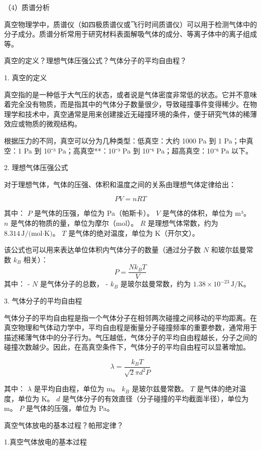 \documentclass[dvipsnames, svgnames,a4paper,11pt]{article}
\begin{document}
（4）质谱分析

真空物理学中，质谱仪（如四极质谱仪或飞行时间质谱仪）可以用于检测气体中的分子成分。质谱分析常用于研究材料表面解吸气体的成分、等离子体中的离子组成等。

\begin{question}
	真空的定义？理想气体压强公式？气体分子的平均自由程？
\end{question}
1. 真空的定义

真空指的是一种低于大气压的状态，或者说是气体密度非常低的状态。它并不意味着完全没有物质，而是指其中的气体分子数量很少，导致碰撞事件变得稀少。在物理学和技术中，真空通常是用来创建接近无碰撞环境的条件，便于研究气体的稀薄效应或物质的微观结构。

根据压力的不同，真空可以分为几种类型：低真空：大约 1000 Pa 到 1 Pa；中真空：1 Pa 到 10⁻³ Pa；高真空**：10⁻³ Pa 到 10⁻⁶ Pa；超高真空：10⁻⁶ Pa 以下。


 2. 理想气体压强公式

对于理想气体，气体的压强、体积和温度之间的关系由理想气体定律给出：

\[
PV = nRT
\]

其中：
 \( P \) 是气体的压强，单位为 Pa（帕斯卡）。
 \( V \) 是气体的体积，单位为 m³。
 \( n \) 是气体的物质的量，单位为摩尔（mol）。
 \( R \) 是理想气体常数，约为 \( 8.314 \, \text{J/(mol·K)} \)。
 \( T \) 是气体的绝对温度，单位为 K（开尔文）。

该公式也可以用来表达单位体积内气体分子的数量（通过分子数 \( N \) 和玻尔兹曼常数 \( k_B \) 相关）：
\[
P = \frac{Nk_B T}{V}
\]
其中：
- \( N \) 是气体分子的总数，
- \( k_B \) 是玻尔兹曼常数，约为 \( 1.38 \times 10^{-23} \, \text{J/K} \)。

 3. 气体分子的平均自由程

气体分子的平均自由程是指一个气体分子在相邻两次碰撞之间移动的平均距离。在真空物理和气体动力学中，平均自由程是衡量分子碰撞频率的重要参数，通常用于描述稀薄气体中的分子行为。气压越低，气体分子的平均自由程越长，分子之间的碰撞次数越少。因此，在高真空条件下，气体分子的平均自由程可以显著增加。


\[
\lambda = \frac{k_B T}{\sqrt{2} \pi d^2 P}
\]

其中：
\( \lambda \) 是平均自由程，单位为 m。
 \( k_B \) 是玻尔兹曼常数。
 \( T \) 是气体的绝对温度，单位为 K。
 \( d \) 是气体分子的有效直径（分子碰撞的平均截面半径），单位为 m。
 \( P \) 是气体的压强，单位为 Pa。

\begin{question}
	真空气体放电的基本过程？帕邢定律？
\end{question}
1.真空气体放电的基本过程
\end{document}
